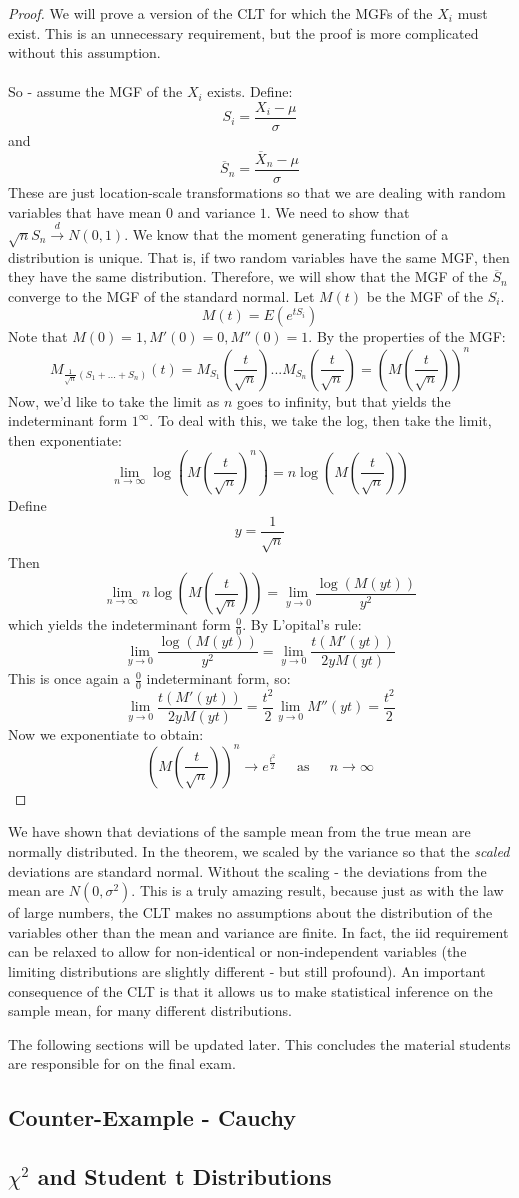 \documentclass[12pt]{article} %
\begin{document}
\begin{proof}
We will prove a version of the CLT for which the MGFs of the $X_i$ must exist. This is an unnecessary requirement, but the proof is more complicated without this assumption.\\\\
So - assume the MGF of the $X_i$ exists. Define:
$$S_i = \frac{X_i-\mu}{\sigma}$$
and
$$\overline{S}_n = \frac{\overline{X}_n-\mu}{\sigma}$$
These are just location-scale transformations so that we are dealing with random variables that have mean $0$ and variance $1$. We need to show that $\sqrt{n}S_n\xrightarrow{d} N(0,1)$. We know that the moment generating function of a distribution is unique. That is, if two random variables have the same MGF, then they have the same distribution. Therefore, we will show that the MGF of the $\overline{S}_n$ converge to the MGF of the standard normal. Let $M(t)$ be the MGF of the $S_i$.
$$M(t) = E(e^{tS_i})$$
Note that $M(0)=1,M'(0)=0,M''(0) =1.$ By the properties of the MGF:
$$M_{\frac{1}{\sqrt{n}}\left(S_1+...+S_n\right)}(t) = M_{S_1}\left(\frac{t}{\sqrt{n}}\right)...M_{S_n}\left(\frac{t}{\sqrt{n}}\right) = \left(M\left(\frac{t}{\sqrt{n}}\right)\right)^n$$ 
Now, we'd like to take the limit as $n$ goes to infinity, but that yields the indeterminant form $1^\infty$. To deal with this, we take the log, then take the limit, then exponentiate:
$$\lim_{n\rightarrow\infty} \log\left(M\left(\frac{t}{\sqrt{n}}\right)^n\right) = n\log\left(M\left(\frac{t}{\sqrt{n}}\right)\right)$$
Define
$$y=\frac{1}{\sqrt{n}}$$
Then
$$\lim_{n\rightarrow\infty}n\log\left(M\left(\frac{t}{\sqrt{n}}\right)\right) = \lim_{y\rightarrow 0} \frac{\log(M(yt))}{y^2}$$
which yields the indeterminant form $\frac{0}{0}$. By L'opital's rule:
$$ \lim_{y\rightarrow 0} \frac{\log(M(yt))}{y^2} =  \lim_{y\rightarrow 0} \frac{t(M'(yt))}{2y M(yt)}$$
This is once again a $\frac{0}{0}$ indeterminant form, so:
$$\lim_{y\rightarrow 0} \frac{t(M'(yt))}{2y M(yt)} = \frac{t^2}{2}\lim_{y\rightarrow 0}M''(yt) = \frac{t^2}{2}$$
Now we exponentiate to obtain:
$$\left(M\left(\frac{t}{\sqrt{n}}\right)\right)^n\rightarrow e^{\frac{t^2}{2}} \;\;\;\;\textrm{ as }\;\;\;\; n\rightarrow \infty$$
\end{proof}
We have shown that deviations of the sample mean from the true mean are normally distributed. In the theorem, we scaled by the variance so that the \emph{scaled} deviations are standard normal. Without the scaling - the deviations from the mean are $N(0,\sigma^2)$. This is a truly amazing result, because just as with the law of large numbers, the CLT makes no assumptions about the distribution of the variables other than the mean and variance are finite. In fact, the iid requirement can be relaxed to allow for non-identical or non-independent variables (the limiting distributions are slightly different - but still profound). An important consequence of the CLT is that it allows us to make statistical inference on the sample mean, for many different distributions.  

The following sections will be updated later. This concludes the material students are responsible for on the final exam.
\subsection{Counter-Example - Cauchy}
\subsection{$\chi^2$ and Student t Distributions}
\end{document}
